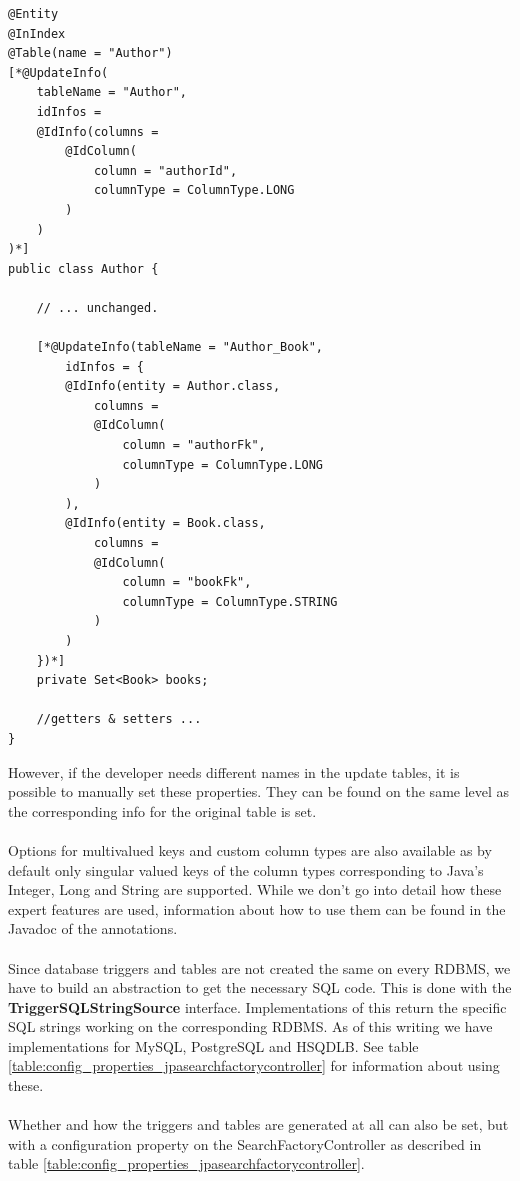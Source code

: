 \lstset{language=java}
\begin{lstlisting}[frame=htrbl, caption={Author.java with Hibernate Search annotations}, label={lst:author.java_3}]
@Entity
@InIndex
@Table(name = "Author")
[*@UpdateInfo(
	tableName = "Author", 
	idInfos = 
	@IdInfo(columns = 
		@IdColumn(
			column = "authorId", 
			columnType = ColumnType.LONG
		)
	)
)*]
public class Author {
	
	// ... unchanged.
	
	[*@UpdateInfo(tableName = "Author_Book", 
		idInfos = {
		@IdInfo(entity = Author.class, 
			columns = 
			@IdColumn(
				column = "authorFk",
				columnType = ColumnType.LONG
			)
		),
		@IdInfo(entity = Book.class,
			columns = 
			@IdColumn(
				column = "bookFk",
				columnType = ColumnType.STRING
			)
		)
	})*]
	private Set<Book> books;
	
	//getters & setters ...
}
\end{lstlisting}
\noindent
However, if the developer needs different names in the update tables, it is possible to manually set these properties. They can be found on the same level as the corresponding info for the original table is set.
\\\\
Options for multivalued keys and custom column types are also available as by default only singular valued keys of the column types corresponding to Java's Integer, Long and String are supported. While we don't go into detail how these expert features are used, information about how to use them can be found in the Javadoc of the annotations.
\\\\
Since database triggers and tables are not created the same on every RDBMS, we have to build an abstraction to get the necessary SQL code. This is done with the \textbf{TriggerSQLStringSource} interface. Implementations of this return the specific SQL strings working on the corresponding RDBMS. As of this writing we have implementations for MySQL, PostgreSQL and HSQDLB. See table \ref{table:config_properties_jpasearchfactorycontroller} for information about using these.
\\\\
Whether and how the triggers and tables are generated at all can also be set, but with a configuration property on the SearchFactoryController as described in table  \ref{table:config_properties_jpasearchfactorycontroller}.

